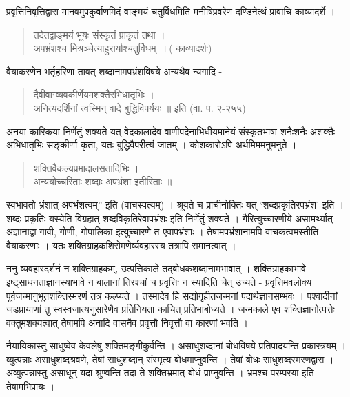{प्रवृत्तिनिवृत्तिद्वारा मानवमुपकुर्वाणमिदं वाङ्मयं चतुर्विधमिति मनीषिप्रवरेण दण्डिनेत्थं प्रावाचि काव्यादर्शे ।
\begin{verse}
तदेतद्वाङ्मयं भूयः संस्कृतं प्राकृतं तथा ।\\
अपभ्रंशश्च मिश्रञ्चेत्याहुरार्याश्चतुर्विधम् ॥ ( काव्यादर्शः)
\end{verse}
वैयाकरणेन भर्तृहरिणा तावत् शब्दानामपभ्रंशविषये अन्यथैव न्यगादि -
\begin{verse}
दैवीवाग्व्यवकीर्णेयमशक्तैरभिधातृभिः ।\\
अनित्यदर्शिनां त्वस्मिन् वादे बुद्धिविपर्ययः ॥ इति (वा. प. २-२५५)
\end{verse}
अनया कारिकया निर्णेतुं शक्यते यत् वेदकालादेव वाणीपदेनाभिधीयमानेयं संस्कृतभाषा शनैःशनैः अशक्तैः अभिधातृभिः सङ्कीर्णा कृता, यतः बुद्धिवैपरीत्यं जातम् । कोशकारोऽपि अर्थमिममनुमनुते ।
\begin{verse}
शक्तिवैकल्यप्रमादालसतादिभिः ।\\
अन्ययोच्चरिताः शब्दाः अपभ्रंशा इतीरिताः ॥ 
\end{verse}
स्वभावतो भ्रंशात् अपभंशत्वम्” इति (वाचस्पत्यम्) । श्रूयते च प्राचीनोक्तिः यत् ‘शब्दप्रकृतिरपभ्रंश’ इति । शब्दः प्रकृतिः यस्येति विग्रहात् शब्दविकृतिरेवापभ्रंशः इति निर्णेतुं शक्यते । गैरित्युच्चारणीये असामर्थ्यात् अज्ञानाद्वा गावी, गोणी, गोपालिका इत्युच्चारणे त एवापभ्रंशाः । तेषामपभ्रंशानामपि वाचकत्वमस्तीति वैयाकरणाः । यतः शक्तिग्राहकशिरोमणेर्व्यवहारस्य तत्रापि समानत्वात् ।

ननु व्यवहारदर्शनं न शक्तिग्राहकम्, उत्पत्तिकाले तद्बोधकशब्दानामभावात् । शक्तिग्राहकाभावे इष्ट्साधनताज्ञानस्याभावे न बालानां तिरश्चां च प्रवृत्तिः न स्यादिति चेत् उच्यते - प्रवृत्तिमवलोक्य पूर्वजन्मानुभूतशक्तिस्मरणं तत्र कल्प्यते । तस्मादेव हि सद्योगृहीतजन्मनां पदार्थज्ञानसम्भवः । पश्वादीनां जडप्रायाणां तु स्वस्वजात्यनुसारेणैव प्रतिनियता काचित् प्रतिभाबोध्यते । जन्मकाले एव शक्तिज्ञानोत्पत्तेः वक्तुमशक्यत्वात् तेषामपि अनादि वासनैव प्रवृत्तौ निवृत्तौ वा कारणां भवति । 

नैयायिकास्तु साधुष्वेव केवलेषु शक्तिमङ्गीकुर्वन्ति । असाधुशब्दानां बोधविषये प्रतिपादयन्ति प्रकारत्रयम् । व्युत्पन्नाः असाधुशब्दश्रवणे, तेषां साधुशब्दान् संस्मृत्य बोधमाप्नुवन्ति । तेषां बोधः साधुशब्दस्मरणद्वारा । अव्युत्पन्नास्तु असाधून् यदा श्रुण्वन्ति तदा ते शक्तिभ्रमात् बोधं प्राप्नुवन्ति । भ्रमश्च परम्परया इति तेषामभिप्रायः ।

}
